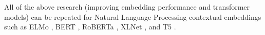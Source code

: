 \documentclass[
	letterpaper, %
	10pt, %
]{LTJournalArticle}
\begin{document}
All of the above research (improving embedding performance and transformer models) can be repeated for Natural Language Processing contextual embeddings such as ELMo \autocite{Peters:2018}, BERT \autocite{Devlin:2018}, RoBERTa \autocite{Liu:2019}, XLNet \autocite{Yang:2022}, and T5 \autocite{Raffel:2020}. 

\printbibliography %

\end{document}

